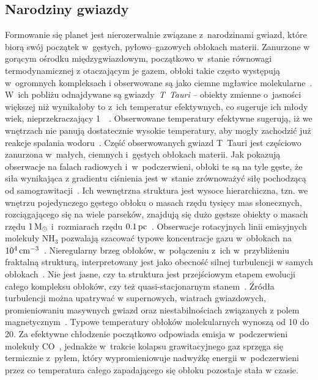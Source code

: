 \subsection{Narodziny gwiazdy}
Formowanie się planet jest nierozerwalnie związane z~narodzinami gwiazd, które
biorą swój początek w~gęstych, pyłowo--gazowych obłokach materii. Zanurzone w
gorącym ośrodku międzygwiazdowym, początkowo w~stanie równowagi termodynamicznej
z otaczającym je gazem, obłoki takie często występują w~ogromnych kompleksach i
obserwowane są jako ciemne mgławice molekularne~\cite{Tielens05}. W~ich pobliżu
odnajdywane są gwiazdy~\emph{T~Tauri} -- obiekty zmienne o~jasności większej niż
wynikałoby to z~ich temperatur efektywnych, co sugeruje ich młody wiek,
nieprzekraczający 1~\Myr~\cite{H62}. Obserwowane temperatury efektywne sugerują,
iż we wnętrzach nie panują dostatecznie wysokie temperatury, aby mogły zachodzić
już reakcje spalania wodoru~\cite{CK79}. Część obserwowanych gwiazd T~Tauri jest
częściowo zanurzona w~małych, ciemnych i~gęstych obłokach materii. Jak pokazują
obserwacje na falach radiowych i~w~podczerwieni, obłoki te są na tyle gęste, że
siła wynikająca z gradientu ciśnienia jest w~stanie zrównoważyć siłę pochodzącą
od samograwitacji~\cite{WT02}. Ich wewnętrzna struktura jest wysoce
hierarchiczna, tzn. we wnętrzu pojedynczego gęstego obłoku o masach rzędu
tysięcy mas słonecznych, rozciągającego się na wiele parseków, znajdują się dużo
gęstsze obiekty o masach rzędu $1\hbox{$\mathrm{\thinspace M_{\odot}}$}$ i~rozmiarach rzędu $0.1\hbox{$\thinspace\textrm{pc}$}$~\cite{M85,
LSM93}. Obserwacje rotacyjnych linii emisyjnych molekuły NH$_3$ pozwalają
szacować typowe koncentracje gazu w~obłokach na $10^{4}\hbox{$\thinspace\textrm{cm}$}^{-3}$~\cite{BM89}.
Nieregularny brzeg obłoków, w~połączeniu z~ich w~przybliżeniu fraktalną
strukturą, interpretowany jest jako obecność silnej turbulencji w samych
obłokach~\cite{E00, FPW91}. Nie jest jasne, czy ta struktura jest przejściowym
etapem ewolucji całego kompleksu obłoków, czy też quasi-stacjonarnym
stanem~\cite{L94}. Źródła turbulencji można upatrywać w supernowych, wiatrach
gwiazdowych, promieniowaniu masywnych gwiazd oraz niestabilnościach związanych
z polem magnetycznym~\cite{NP03, MLK04}. 
Typowe temperatury obłoków molekularnych wynoszą od
10 do 20\K. Za efektywne chłodzenie początkowo odpowiada emisja w~podczerwieni
molekuły CO~\cite{MSWG82}, jednakże w~trakcie kolapsu grawitacyjnego gaz sprzęga
się termicznie z~pyłem, który wypromieniowuje nadwyżkę energii
w~podczerwieni~\cite{HN65, MI00} przez co temperatura całego zapadającego się
obłoku pozostaje stała w czasie.

